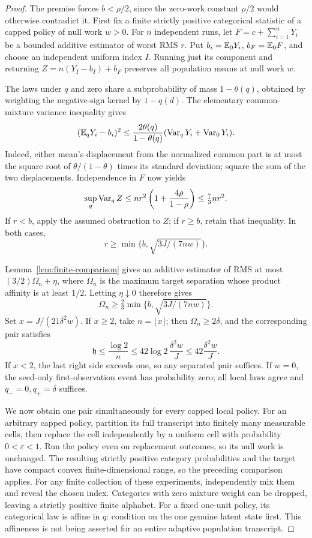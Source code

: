 \begin{proof}
The premise forces \(b<\rho/2\), since the zero-work constant \(\rho/2\)
would otherwise contradict it.  First fix a finite strictly positive
categorical statistic of a capped policy of null work \(w>0\).
For \(n\) independent runs, let
\(F=c+\sum_{i=1}^nY_i\) be a bounded additive estimator of worst RMS
\(r\).  Put \(b_i=\mathbb E_0Y_i\), \(b_F=\mathbb E_0F\), and choose an independent
uniform index \(I\).  Running just its component and returning
\(Z=n(Y_I-b_I)+b_F\) preserves all population means at null work \(w\).

The laws under \(q\) and zero share a subprobability of mass
\(1-\theta(q)\), obtained by weighting the negative-sign kernel by
\(1-q(d)\).  The elementary common-mixture variance inequality gives
\[
 (\mathbb E_qY_i-b_i)^2\le
 \frac{2\theta(q)}{1-\theta(q)}
                 (\operatorname{Var}_qY_i+\operatorname{Var}_0Y_i).
\]
Indeed, either mean's displacement from the normalized common part is
at most the square root of \(\theta/(1-\theta)\) times its standard
deviation; square the sum of the two displacements.  Independence in
\(F\) now yields
\[
 \sup_q\operatorname{Var}_qZ\le
 nr^2\left(1+\frac{4\rho}{1-\rho}\right)\le\tfrac73nr^2.
\]
If \(r<b\), apply the assumed obstruction to \(Z\); if \(r\ge b\),
retain that inequality.  In both cases,
\[
 r\ge\min\{b,\sqrt{3J/(7nw)}\}.
\]

Lemma~\ref{lem:finite-comparison} gives an additive estimator of
RMS at most \((3/2)\Omega_n+\eta\), where \(\Omega_n\) is the maximum
target separation whose product affinity is at least \(1/2\).
Letting \(\eta\downarrow0\) therefore gives
\[
 \Omega_n\ge\tfrac23\min\{b,\sqrt{3J/(7nw)}\}.
\]
Set \(x=J/(21\delta^2w)\).  If \(x\ge2\), take
\(n=\lfloor x\rfloor\); then \(\Omega_n\ge2\delta\), and the
corresponding pair satisfies
\[
 \mathfrak h\le\frac{\log2}{n}
 \le42\log2\,\frac{\delta^2w}{J}
 \le42\frac{\delta^2w}{J}.
\]
If \(x<2\), the last right side exceeds one, so any separated pair
suffices.  If \(w=0\), the seed-only first-observation event has
probability zero; all local laws agree and \(q_-=0,q_+=\delta\)
suffices.

We now obtain one pair simultaneously for every capped local policy.
For an arbitrary capped policy, partition its full transcript into finitely
many measurable cells, then replace the cell independently by a uniform
cell with probability \(0<\varepsilon<1\).  Run the policy even on
replacement outcomes, so its null work is unchanged.  The resulting
strictly positive category probabilities and the target have compact
convex finite-dimensional range, so the preceding comparison applies.
For any finite collection of these experiments, independently mix them
and reveal the chosen index. Categories with zero mixture weight can be
dropped, leaving a strictly positive finite alphabet. For a fixed one-unit
policy, its categorical law is affine in $q$: condition on the one genuine
latent state first. This affineness is not being asserted for an entire
adaptive population transcript.


\end{proof}
